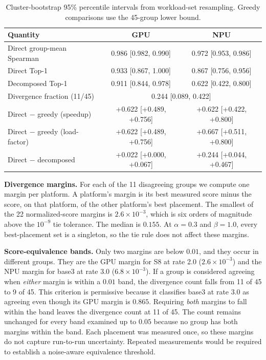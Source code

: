 \documentclass{article}
\begin{document}
\begin{table}[h]
\centering
\caption{Cluster-bootstrap 95\% percentile intervals from workload-set resampling. Greedy comparisons use the 45-group lower bound.}
\label{tab:app_boot}
\footnotesize
\setlength{\tabcolsep}{4pt}
\begin{tabular}{@{}l cc@{}}
\toprule
Quantity & GPU & NPU \\
\midrule
Direct group-mean Spearman & 0.986 [0.982, 0.990] & 0.972 [0.953, 0.986] \\
Direct Top-1 & 0.933 [0.867, 1.000] & 0.867 [0.756, 0.956] \\
Decomposed Top-1 & 0.911 [0.844, 0.978] & 0.622 [0.422, 0.800] \\
Divergence fraction (11/45) & \multicolumn{2}{c}{0.244 [0.089, 0.422]} \\
\midrule
Direct $-$ greedy (speedup) & +0.622 [+0.489, +0.756] & +0.622 [+0.422, +0.800] \\
Direct $-$ greedy (load-factor) & +0.622 [+0.489, +0.756] & +0.667 [+0.511, +0.800] \\
Direct $-$ decomposed & +0.022 [+0.000, +0.067] & +0.244 [+0.044, +0.467] \\
\bottomrule
\end{tabular}
\end{table}

\textbf{Divergence margins.} For each of the 11 disagreeing groups we compute one margin per platform. A platform's margin is its best measured score minus the score, on that platform, of the other platform's best placement. The smallest of the 22 normalized-score margins is $2.6\times10^{-3}$, which is six orders of magnitude above the $10^{-9}$ tie tolerance. The median is $0.155$. At $\alpha{=}0.3$ and $\beta{=}1.0$, every best-placement set is a singleton, so the tie rule does not affect these margins.

\textbf{Score-equivalence bands.} Only two margins are below $0.01$, and they occur in different groups. They are the GPU margin for S8 at rate 2.0 ($2.6\times10^{-3}$) and the NPU margin for base3 at rate 3.0 ($6.8\times10^{-3}$). If a group is considered agreeing when \emph{either} margin is within a $0.01$ band, the divergence count falls from 11 of 45 to 9 of 45. This criterion is permissive because it classifies base3 at rate 3.0 as agreeing even though its GPU margin is $0.865$. Requiring \emph{both} margins to fall within the band leaves the divergence count at 11 of 45. The count remains unchanged for every band examined up to $0.05$ because no group has both margins within the band. Each placement was measured once, so these margins do not capture run-to-run uncertainty. Repeated measurements would be required to establish a noise-aware equivalence threshold.
\end{document}
